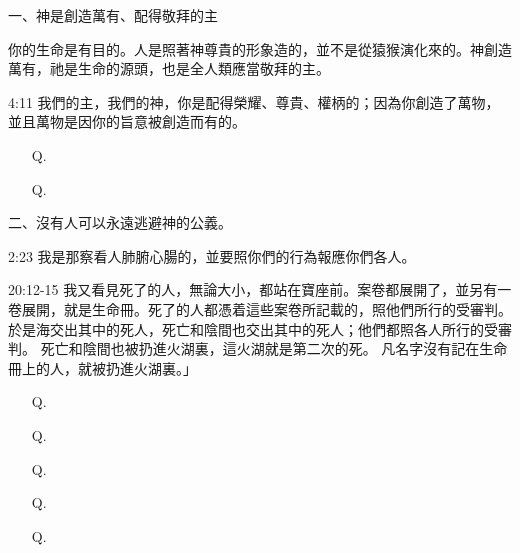\clearpage
{}
\begin{center}
\begin{tcolorbox}[
    width=0.95\textwidth,
    colback=white, %
    colframe=gray!70,
    colbacktitle=gray,
    coltitle=white,
    title={\small{\centering 你知道啓示錄中，包含了許多神要讓你知道的福音嗎？}},
    fontupper=\small\setstretch{1.0},
    enhanced,
    boxrule=0.5pt,
    breakable,
    left=0pt,
    right=6pt,
    top=6pt,
    bottom=6pt
]

一、神是創造萬有、配得敬拜的主

你的生命是有目的。人是照著神尊貴的形象造的，並不是從猿猴演化來的。神創造萬有，祂是生命的源頭，也是全人類應當敬拜的主。
\begin{ScriptureBox}
\item[4:11] 我們的主，我們的神，你是配得榮耀、尊貴、權柄的；因為你創造了萬物，並且萬物是因你的旨意被創造而有的。
\end{ScriptureBox}

\begin{itemize}[leftmargin=2em, labelsep=0.3em]
\item[Q.] 
\item[Q.] 
\end{itemize}
\vspace{0.3cm}

二、沒有人可以永遠逃避神的公義。
\begin{ScriptureBox}
\item[2:23] 我是那察看人肺腑心腸的，並要照你們的行為報應你們各人。
\item[20:12-15] 我又看見死了的人，無論大小，都站在寶座前。案卷都展開了，並另有一卷展開，就是生命冊。死了的人都憑着這些案卷所記載的，照他們所行的受審判。 於是海交出其中的死人，死亡和陰間也交出其中的死人；他們都照各人所行的受審判。 死亡和陰間也被扔進火湖裏，這火湖就是第二次的死。 凡名字沒有記在生命冊上的人，就被扔進火湖裏。」
\end{ScriptureBox}

\begin{itemize}[leftmargin=2em, labelsep=0.3em]
\item[Q.] 
\item[Q.] 
\item[Q.] 
\item[Q.] 
\item[Q.] 
\end{itemize}



\end{tcolorbox}
\end{center}
